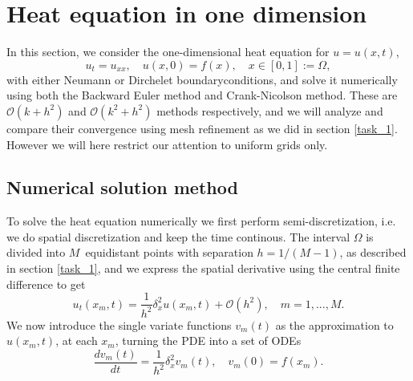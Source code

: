 \section{Heat equation in one dimension}
\label{heat-equation}
In this section, we consider the one-dimensional heat equation for $u = u(x, t)$, 
\begin{equation*}
    u_t = u_{xx}, \quad u(x, 0) = f(x), \quad x \in [0,1] := \Omega, 
    \label{eq:heat-eq}
\end{equation*}
with either Neumann or Dirchelet boundaryconditions, 
and solve it numerically using both the Backward Euler method and Crank-Nicolson method. 
These are $\mathcal{O}(k+h^2)$ and $\mathcal{O}(k^2+h^2)$ methods respectively, 
and we will analyze and compare their convergence using mesh refinement as we did in section \ref{task_1}. However we will here restrict our attention to uniform grids only. 

\subsection{Numerical solution method}
To solve the heat equation numerically we first perform semi-discretization, 
i.e. we do spatial discretization and keep the time continous. 
The interval $\Omega$ is divided into $M$ equidistant points with separation $h=1/(M-1)$, 
as described in section \ref{task_1}, 
and we express the spatial derivative using the central finite difference to get %
\begin{equation*}
    u_t(x_m, t) = \frac{1}{h^2} \delta_x^2 u(x_m, t) + \mathcal{O}(h^2), 
    \quad m = 1,...,M.
\end{equation*}
We now introduce the single variate functions $v_m(t)$ as the approximation to $u(x_m, t)$, 
at each $x_m$, 
turning the PDE into a set of ODEs 
\begin{equation*}
    \frac{dv_m(t)}{dt} = \frac{1}{h^2} \delta_x^2 v_m(t), 
    \quad v_m(0) = f(x_m). 
\end{equation*}

